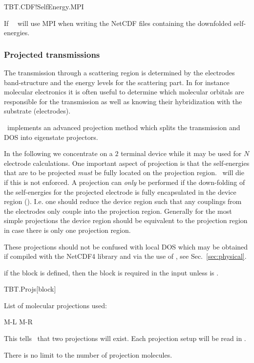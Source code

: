 \begin{fdflogicalF}{TBT.CDF!SelfEnergy.MPI}%

  If \fdftrue\ \tbtrans\ will use MPI when writing the NetCDF files
  containing the downfolded self-energies.

\end{fdflogicalF}


\subsubsection{Projected transmissions}

The transmission through a scattering region is determined by the
electrodes band-structure and the energy levels for the scattering
part. In for instance molecular electronics it is often useful to
determine which molecular orbitals are responsible for the
transmission as well as knowing their hybridization with the substrate
(electrodes).

\tbtrans\ implements an advanced projection method which splits the
transmission and DOS into eigenstate projectors.

In the following we concentrate on a $2$ terminal device while it may
be used for $N$ electrode calculations. 
%
One important aspect of projection is that the self-energies that are
to be projected \emph{must} be fully located on the projection
region. \tbtrans\ will die if this is not enforced.
%
A projection can \emph{only} be performed if the down-folding of the
self-energies for the projected electrode is fully encapsulated in the
device region (). I.e. one should reduce the
device region such that any couplings from the electrodes only couple
into the projection region. Generally for the most simple projections
the device region should be equivalent to the projection region in
case there is only one projection region.

These projections should not be confused with local DOS which may be
obtained if compiled with the NetCDF4 library and via the use of
\sisl, see Sec.~\ref{sec:physical}.

\note if the  block is defined, then the
 block is required in the input unless
 is \fdftrue.


\begin{fdfentry}{TBT.Projs}[block]

  List of molecular projections used:
\begin{fdfexample}
    M-L
    M-R
\end{fdfexample}

  This tells \tbtrans\ that two projections will exist. Each
  projection setup will be read in .

  There is no limit to the number of projection molecules.
  
\end{fdfentry}

